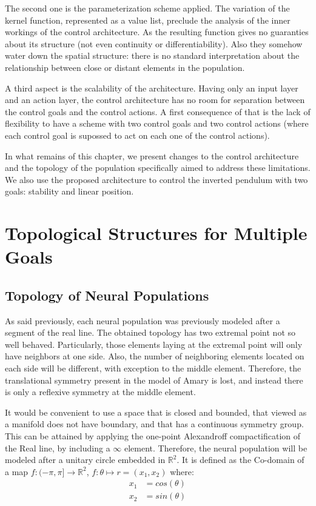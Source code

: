 The second one is the parameterization scheme applied. The variation
of the kernel function, represented as a value list, preclude the
analysis of the inner workings of the control architecture. As the
resulting function gives no guaranties about its structure (not even
continuity or differentiability). Also they somehow water down the
spatial structure: there is no standard interpretation about the
relationship between close or distant elements in the population.

A third aspect is the scalability of the architecture. Having only an
input layer and an action layer, the control architecture has no room
for separation between the control goals and the control actions. A
first consequence of that is the lack of flexibility to have a scheme
with two control goals and two control actions (where each control
goal is supossed to act on each one of the control actions).

In what remains of this chapter, we present changes to the
control architecture and the topology of the population specifically
aimed to address these limitations. We also use the proposed
architecture to control the inverted pendulum with two goals:
stability and linear position.

\section{Topological Structures for Multiple Goals}
\label{sec:chp3-topological}
\subsection{Topology of Neural Populations}
As said previously, each neural population was previously modeled
after a segment of the real line. The obtained topology has two
extremal point not so well behaved. Particularly, those elements
laying at the extremal point will only have neighbors at one
side. Also, the number of neighboring elements located on each side
will be different, with exception to the middle element. Therefore,
the translational symmetry present in the model of Amary is lost, and
instead there is only a reflexive symmetry at the middle element.

It would be convenient to use a space that is closed and bounded, that
viewed as a manifold does not have boundary, and that has a continuous
symmetry group. This can be attained by applying the one-point
Alexandroff compactification of the Real line, by including a $\infty$
element. Therefore, the neural population will be modeled after a
unitary circle embedded in $\mathbb{R}^2$. It is defined as the
Co-domain of a map $f: (-\pi,\pi]\rightarrow \mathbb{R}^2$, $f:\theta
\mapsto r=(x_1,x_2)$ where:
\begin{align}
  x_1 &= cos(\theta)\\
  x_2 &= sin(\theta)
\end{align}

